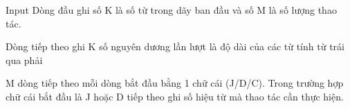 Input
Dòng đầu ghi số K là số từ trong dãy ban đầu và số M là số lượng thao tác.

Dòng tiếp theo ghi K số nguyên dương lần lượt là độ dài của các từ tính từ trái qua phải

M dòng tiếp theo mỗi dòng bắt đầu bằng 1 chữ cái (J/D/C). Trong trường hợp chữ cái bắt đầu là J hoặc D tiếp theo ghi số hiệu từ mà thao tác cần thực hiện.